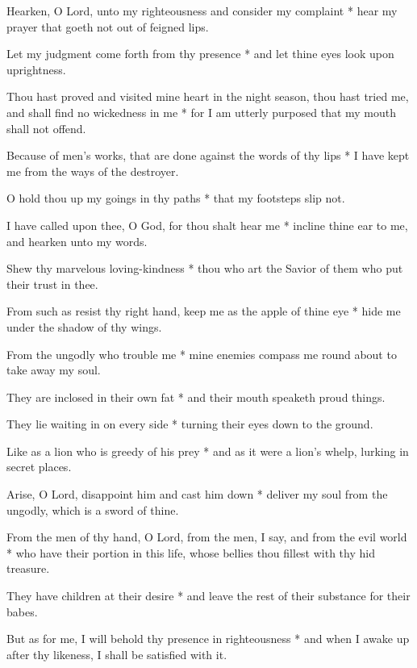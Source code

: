 Hearken, O Lord, unto my righteousness and consider my complaint * hear my prayer that goeth not out of feigned lips.

Let my judgment come forth from thy presence * and let thine eyes look upon uprightness.

Thou hast proved and visited mine heart in the night season, thou hast tried me, and shall find no wickedness in me * for I am utterly purposed that my mouth shall not offend.

Because of men's works, that are done against the words of thy lips * I have kept me from the ways of the destroyer.

O hold thou up my goings in thy paths * that my footsteps slip not.

I have called upon thee, O God, for thou shalt hear me * incline thine ear to me, and hearken unto my words.

Shew thy marvelous loving-kindness * thou who art the Savior of them who put their trust in thee.

From such as resist thy right hand, keep me as the apple of thine eye * hide me under the shadow of thy wings.

From the ungodly who trouble me * mine enemies compass me round about to take away my soul.

They are inclosed in their own fat * and their mouth speaketh proud things.

They lie waiting in on every side * turning their eyes down to the ground.

Like as a lion who is greedy of his prey * and as it were a lion's whelp, lurking in secret places.

Arise, O Lord, disappoint him and cast him down * deliver my soul from the ungodly, which is a sword of thine.

From the men of thy hand, O Lord, from the men, I say, and from the evil world * who have their portion in this life, whose bellies thou fillest with thy hid treasure.

They have children at their desire * and leave the rest of their substance for their babes.

But as for me, I will behold thy presence in righteousness * and when I awake up after thy likeness, I shall be satisfied with it.